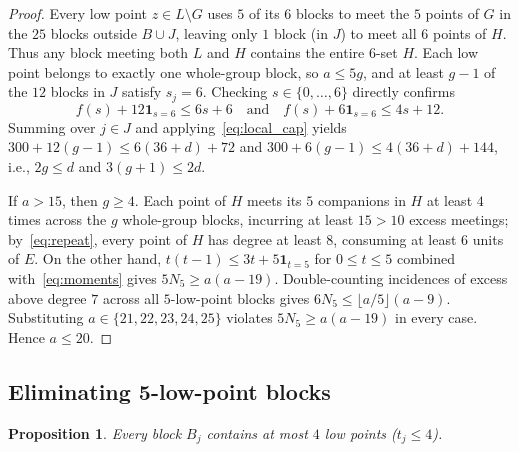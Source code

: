 \documentclass[11pt,a4paper]{article}
\newtheorem{proposition}[theorem]{Proposition}
\theoremstyle{definition}
\theoremstyle{remark}
\begin{document}
\begin{proof}
Every low point $z \in L \setminus G$ uses $5$ of its $6$ blocks to meet the $5$ points of $G$ in the $25$ blocks outside $B \cup J$, leaving only $1$ block (in $J$) to meet all $6$ points of $H$. Thus any block meeting both $L$ and $H$ contains the entire $6$-set $H$. Each low point belongs to exactly one whole-group block, so $a \le 5g$, and at least $g - 1$ of the $12$ blocks in $J$ satisfy $s_j = 6$. Checking $s \in \{0,\dots,6\}$ directly confirms
\[
  f(s) + 12\mathbf{1}_{s=6} \le 6s + 6 \quad\text{and}\quad f(s) + 6\mathbf{1}_{s=6} \le 4s + 12.
\]
Summing over $j \in J$ and applying~\eqref{eq:local_cap} yields $300 + 12(g-1) \le 6(36+d) + 72$ and $300 + 6(g-1) \le 4(36+d) + 144$, i.e., $2g \le d$ and $3(g+1) \le 2d$.

If $a > 15$, then $g \ge 4$. Each point of $H$ meets its $5$ companions in $H$ at least $4$ times across the $g$ whole-group blocks, incurring at least $15 > 10$ excess meetings; by~\eqref{eq:repeat}, every point of $H$ has degree at least $8$, consuming at least $6$ units of $E$. On the other hand, $t(t-1) \le 3t + 5\mathbf{1}_{t=5}$ for $0 \le t \le 5$ combined with~\eqref{eq:moments} gives $5N_5 \ge a(a-19)$. Double-counting incidences of excess above degree $7$ across all $5$-low-point blocks gives $6N_5 \le \lfloor a/5 \rfloor (a - 9)$. Substituting $a \in \{21,22,23,24,25\}$ violates $5N_5 \ge a(a-19)$ in every case. Hence $a \le 20$.
\end{proof}

\subsection{Eliminating 5-low-point blocks}\label{sec:no_five}

\begin{proposition}\label{prop:t_le_4}
Every block $B_j$ contains at most $4$ low points ($t_j \le 4$).
\end{proposition}
\end{document}
